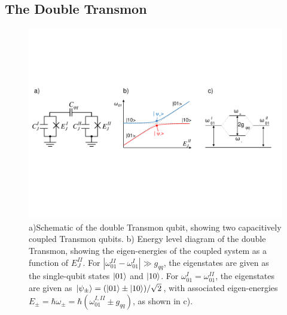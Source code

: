 \subsection{The Double Transmon} \label{section:double_transmon}

\begin{figure}[ht!]
	\centering
	\includegraphics[width=\textwidth]{./material/figures/scalable-architecture/double_transmon_schematic}
	\caption[...]{a)Schematic of the double Transmon qubit, showing two capacitively coupled Transmon qubits. b) Energy level diagram of the double Transmon, showing the eigen-energies of the coupled system as a function of $E_J^{II}$. For $|\omega_{01}^{II}-\omega_{01}^{I}|\gg g_{qq}$, the eigenstates are given as the single-qubit states $\left| 01 \right>$ and $\left| 10 \right>$. For $\omega_{01}^I = \omega_{01}^{II}$, the eigenstates are given as $\left| \psi_\pm \right>=(\left| 01 \right>\pm\left| 10 \right>)/\sqrt{2}$, with associated eigen-energies $E_\pm = \hbar\omega_\pm = \hbar(\omega_{01}^{I,II}\pm g_{qq})$, as shown in c).}
	\label{fig:qubit_molecule_schematic}
\end{figure}

